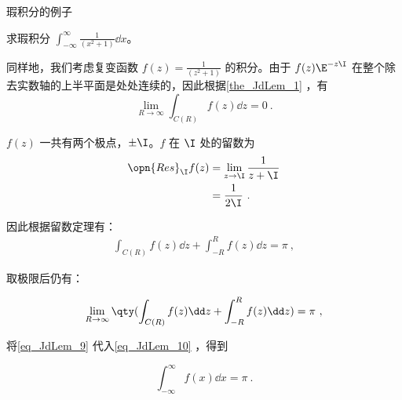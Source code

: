 \begin{example}{瑕积分的例子}

求瑕积分 $\int_{-\infty}^\infty \frac{1}{(x^2+1)}\dd x$。

同样地，我们考虑复变函数 $f(z)=\frac{1}{(z^2+1)}$ 的积分。由于 $f(z)\E^{-z\I}$ 在整个除去实数轴的上半平面是处处连续的，因此根据\autoref{the_JdLem_1} ，有
\begin{equation}\label{eq_JdLem_9}
\lim\limits_{R\to \infty}\int_{C(R)}f(z)\dd z=0~.
\end{equation}

$f(z)$ 一共有两个极点，$\pm\I$。$f$ 在 $\I$ 处的留数为
\begin{equation}
\begin{aligned}
\opn{Res}_\I f(z)&=\lim\limits_{z\to\I}\frac{1}{z+\I}\\
&=\frac{1}{2\I}~.
\end{aligned}
\end{equation}

因此根据留数定理有：
\begin{equation}\label{eq_JdLem_8}
\begin{aligned}
\int_{C(R)}f(z)\dd z+\int_{-R}^R f(z)\dd z=\pi~,
\end{aligned}
\end{equation}

取极限后仍有：

\begin{equation}\label{eq_JdLem_10}
\begin{aligned}
\lim\limits_{R\to \infty}\qty(\int_{C(R)}f(z)\dd z+\int_{-R}^R f(z)\dd z)=\pi~,
\end{aligned}
\end{equation}

将\autoref{eq_JdLem_9} 代入\autoref{eq_JdLem_10} ，得到

\begin{equation}
\int^\infty_{-\infty} f(x)\dd x=\pi~.
\end{equation}



\end{example}





























